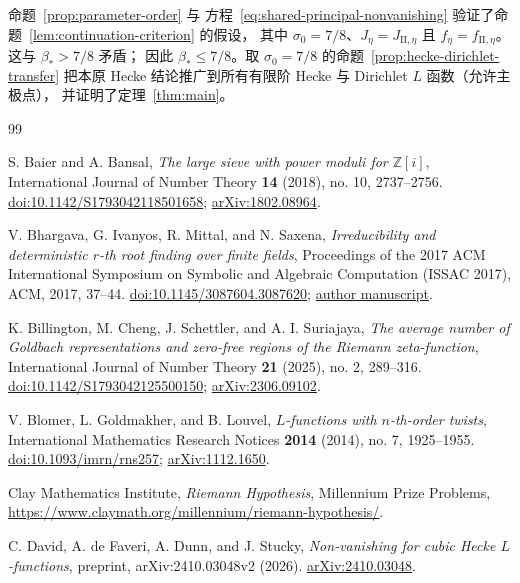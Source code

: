 \documentclass[11pt,a4paper]{article}
\numberwithin{equation}{section}
\numberwithin{figure}{section}
\theoremstyle{definition}
\theoremstyle{remark}
\begin{document}
命题~\ref{prop:parameter-order} 与
方程~\eqref{eq:shared-principal-nonvanishing} 验证了命题~\ref{lem:continuation-criterion} 的假设，
其中 \(\sigma_0=7/8\)、\(J_\eta=J_{\mathrm{II},\eta}\) 且
\(f_\eta=f_{\mathrm{II},\eta}\)。这与 \(\beta_*>7/8\) 矛盾；
因此 \(\beta_*\le7/8\)。取 \(\sigma_0=7/8\) 的命题~\ref{prop:hecke-dirichlet-transfer}
把本原 Hecke 结论推广到所有有限阶 Hecke 与 Dirichlet \(L\) 函数（允许主极点），
并证明了定理~\ref{thm:main}。

\begin{thebibliography}{99}

S. Baier and A. Bansal,
\emph{The large sieve with power moduli for $\mathbb Z[i]$},
International Journal of Number Theory \textbf{14} (2018), no. 10,
2737--2756.
\href{https://doi.org/10.1142/S1793042118501658}{doi:10.1142/S1793042118501658};
\href{https://arxiv.org/abs/1802.08964}{arXiv:1802.08964}.

V. Bhargava, G. Ivanyos, R. Mittal, and N. Saxena,
\emph{Irreducibility and deterministic $r$-th root finding over finite fields},
Proceedings of the 2017 ACM International Symposium on Symbolic and
Algebraic Computation (ISSAC 2017), ACM, 2017, 37--44.
\href{https://doi.org/10.1145/3087604.3087620}{doi:10.1145/3087604.3087620};
\href{https://www.cse.iitk.ac.in/users/nitin/papers/irred-and-rth-root.pdf}{author manuscript}.

K. Billington, M. Cheng, J. Schettler, and A. I. Suriajaya,
\emph{The average number of Goldbach representations and zero-free regions
of the Riemann zeta-function},
International Journal of Number Theory \textbf{21} (2025), no. 2, 289--316.
\href{https://doi.org/10.1142/S1793042125500150}{doi:10.1142/S1793042125500150};
\href{https://arxiv.org/abs/2306.09102}{arXiv:2306.09102}.

V. Blomer, L. Goldmakher, and B. Louvel,
\emph{$L$-functions with $n$-th-order twists},
International Mathematics Research Notices \textbf{2014} (2014), no. 7,
1925--1955.
\href{https://doi.org/10.1093/imrn/rns257}{doi:10.1093/imrn/rns257};
\href{https://arxiv.org/abs/1112.1650}{arXiv:1112.1650}.

Clay Mathematics Institute,
\emph{Riemann Hypothesis}, Millennium Prize Problems,
\url{https://www.claymath.org/millennium/riemann-hypothesis/}.

C. David, A. de Faveri, A. Dunn, and J. Stucky,
\emph{Non-vanishing for cubic Hecke $L$-functions},
preprint, arXiv:2410.03048v2 (2026).
\href{https://arxiv.org/abs/2410.03048}{arXiv:2410.03048}.


\end{thebibliography}
\end{document}
